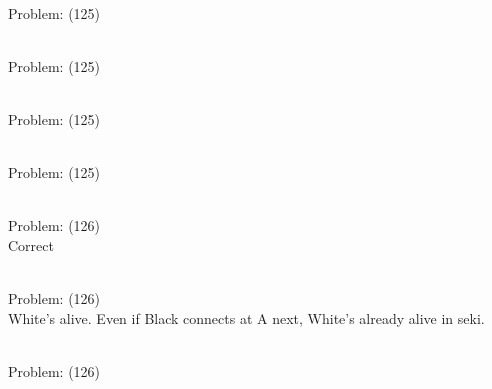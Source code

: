 \documentclass[11pt]{article}
\begin{document}
\begin{minipage}[t]{0.5\textwidth}
  {\centering
  
\\
Problem: (125)\\
  }
\end{minipage}
\begin{minipage}[t]{0.5\textwidth}
  {\centering
  
\\
Problem: (125)\\
  }
\end{minipage}
\begin{minipage}[t]{0.5\textwidth}
  {\centering
  
\\
Problem: (125)\\
  }
\end{minipage}
\begin{minipage}[t]{0.5\textwidth}
  {\centering
  
\\
Problem: (125)\\
  }
\end{minipage}
\begin{minipage}[t]{0.5\textwidth}
  {\centering
  
\\
Problem: (126)\\
Correct\\
  }
\end{minipage}
\begin{minipage}[t]{0.5\textwidth}
  {\centering
  
\\
Problem: (126)\\
White's alive. Even if Black connects at A next, White's already alive in seki.\\
  }
\end{minipage}
\begin{minipage}[t]{0.5\textwidth}
  {\centering
  
\\
Problem: (126)\\
  }
\end{minipage}
\end{document}
